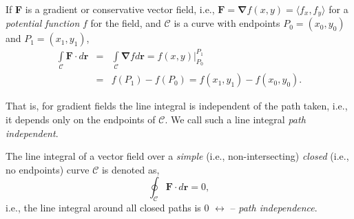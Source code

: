 \begin{theorem}
   If {\bf F} is a gradient or conservative vector field, i.e., $\mathbf{F}=\mathbf{\nabla}f(x,y)=\langle f_{x}, f_{y}\rangle$ for a {\it potential function} $f$ for the field, and $\mathcal{C}$ is a curve with endpoints $P_{0}=\left(x_{0},y_{0}\right)$ and $P_{1}=\left(x_{1},y_{1}\right)$,
      \begin{eqnarray}
         \int\limits_{\mathcal{C}}\mathbf{F}\cdot d\mathbf{r} &=& \int\limits_{\mathcal{C}}\mathbf{\nabla}f d \mathbf{r} = \left.f(x,y)\right|_{P_{0}}^{P_{1}}\\
                                                           &=& f\left(P_{1}\right)-f\left(P_{0}\right) = f\left(x_{1},y_{1}\right) - f\left(x_{0},y_{0}\right)\nonumber.
      \end{eqnarray}
\end{theorem} 
That is, for gradient fields the line integral is independent of the path taken, i.e., it depends only on the endpoints of $\mathcal{C}$. We call such a line integral {\it path independent}.
\medskip

The line integral of a vector field over a {\it simple} (i.e., non-intersecting) {\it closed} (i.e., no endpoints) curve $\mathcal{C}$ is denoted as,
        \begin{equation}
           \oint_{\mathcal{C}}\mathbf{F}\cdot d \mathbf{r} = 0,
        \end{equation}
i.e., the line integral around all closed paths is 0 $\leftrightarrow$ -- {\it path independence}. \cite{NumericalRecipes,Atkinson_Book}
